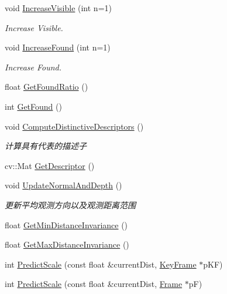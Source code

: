 \begin{DoxyCompactItemize}
\item 
void \mbox{\hyperlink{class_o_r_b___s_l_a_m2_1_1_map_point_a0a234f5bd6bc19a9ea55fad0c9e6db5f}{Increase\+Visible}} (int n=1)
\begin{DoxyCompactList}\small\item\em Increase Visible. \end{DoxyCompactList}\item 
void \mbox{\hyperlink{class_o_r_b___s_l_a_m2_1_1_map_point_aa097cd8cf993a54e999f297e05729392}{Increase\+Found}} (int n=1)
\begin{DoxyCompactList}\small\item\em Increase Found. \end{DoxyCompactList}\item 
float \mbox{\hyperlink{class_o_r_b___s_l_a_m2_1_1_map_point_ac1b7c69a2d9f6bd785d465380844ce10}{Get\+Found\+Ratio}} ()
\item 
int \mbox{\hyperlink{class_o_r_b___s_l_a_m2_1_1_map_point_a0d081d56b0f398c52581b3e0eaa1cb15}{Get\+Found}} ()
\item 
void \mbox{\hyperlink{class_o_r_b___s_l_a_m2_1_1_map_point_ab4c3dfd8f5f05a4b1888021f1fac3d84}{Compute\+Distinctive\+Descriptors}} ()
\begin{DoxyCompactList}\small\item\em 计算具有代表的描述子 \end{DoxyCompactList}\item 
cv\+::\+Mat \mbox{\hyperlink{class_o_r_b___s_l_a_m2_1_1_map_point_a8f9faa5b4cc513795485dcfb460ea3d0}{Get\+Descriptor}} ()
\item 
void \mbox{\hyperlink{class_o_r_b___s_l_a_m2_1_1_map_point_ac5b8e4ec6a7737860af57058bdd16124}{Update\+Normal\+And\+Depth}} ()
\begin{DoxyCompactList}\small\item\em 更新平均观测方向以及观测距离范围 \end{DoxyCompactList}\item 
float \mbox{\hyperlink{class_o_r_b___s_l_a_m2_1_1_map_point_aac7224845c1d39016c50dcaacc0ebe40}{Get\+Min\+Distance\+Invariance}} ()
\item 
float \mbox{\hyperlink{class_o_r_b___s_l_a_m2_1_1_map_point_abf921da31ee4d522181bb6b8d9149fff}{Get\+Max\+Distance\+Invariance}} ()
\item 
int \mbox{\hyperlink{class_o_r_b___s_l_a_m2_1_1_map_point_aa0e884ba7dc5b85ddb5ccb64113a8594}{Predict\+Scale}} (const float \&current\+Dist, \mbox{\hyperlink{class_o_r_b___s_l_a_m2_1_1_key_frame}{Key\+Frame}} $\ast$p\+KF)
\item 
int \mbox{\hyperlink{class_o_r_b___s_l_a_m2_1_1_map_point_af083bd50463ee191a1abb540bb40ea3d}{Predict\+Scale}} (const float \&current\+Dist, \mbox{\hyperlink{class_o_r_b___s_l_a_m2_1_1_frame}{Frame}} $\ast$pF)
\end{DoxyCompactItemize}

